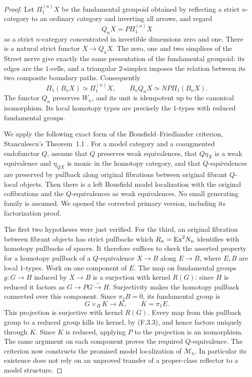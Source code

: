 \begin{proof}
Let $\Pi^{(n)}_1X$ be the fundamental groupoid obtained by
reflecting a strict $n$-category to an ordinary category and
inverting all arrows, and regard
\[
                   Q_nX=P\Pi^{(n)}_1X
\]
as a strict $n$-category concentrated in invertible dimensions zero
and one. There is a natural strict functor $X\to Q_nX$.
The zero, one and two simplices of the Street nerve give exactly
the same presentation of the fundamental groupoid: its edges are
the $1$-cells, and a triangular $2$-simplex imposes the relation
between its two composite boundary paths. Consequently
\[
 \Pi_1(B_nX)\simeq\Pi^{(n)}_1X,
 \qquad B_nQ_nX\simeq N P\Pi_1(B_nX).
\]
The functor $Q_n$ preserves $W_n$, and its unit is idempotent
up to the canonical isomorphism. Its local homotopy types are
precisely the $1$-types with reduced fundamental groups.

We apply the following exact form of the Bousfield--Friedlander
criterion, Stanculescu's Theorem~1.1 \cite{I_Stanculescu2008}.
For a model category and a coaugmented endofunctor $Q$, assume
that $Q$ preserves weak equivalences, that $Q\eta_X$ is a weak
equivalence and $\eta_{QX}$ is monic in the homotopy category,
and that $Q$-equivalences are preserved by pullback along original
fibrations between original fibrant $Q$-local objects. Then there
is a left Bousfield model localization with the original
cofibrations and the $Q$-equivalences as weak equivalences.
No small generating family is assumed. We opened the corrected
primary version, including its factorization proof.

The first two hypotheses were just verified. For the third,
an original fibration between fibrant objects has strict pullbacks
which $R_n=\mathrm{Ex}^2N_n$ identifies with homotopy pullbacks of
spaces. It therefore suffices to check the asserted property for
a homotopy pullback of a $Q$-equivalence $X\to B$ along
$E\to B$, where $E,B$ are local $1$-types. Work on one component
of $E$. The map on fundamental groups $g:G\to H$ induced by
$X\to B$ is a surjection with kernel $R(G)$: since $H$ is
reduced it factors as $G\to PG\xrightarrow{\sim}H$.
Surjectivity makes the homotopy pullback connected over this
component. Since $\pi_2B=0$, its fundamental group is
\[
             G\times_H K\longrightarrow K,
             \qquad K=\pi_1E.
\]
This projection is surjective with kernel $R(G)$. Every map
from this pullback group to a reduced group kills its kernel,
by (F.3.3), and hence factors uniquely through $K$. Since $K$
is reduced, applying $P$ to the projection is an isomorphism.
The same argument on each component proves the required
$Q$-equivalence. The criterion now constructs the promised
model localization of $\mathcal M_n$. In particular its existence
does not rely on an unproved transfer of a proper-class reflector
to a model structure.


\end{proof}
